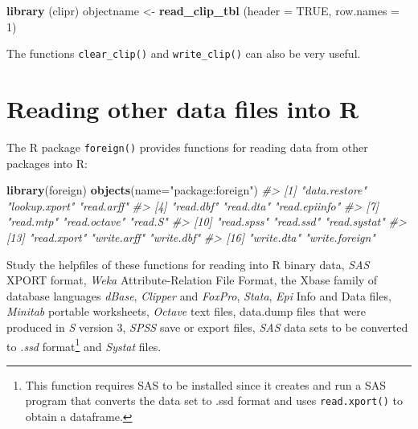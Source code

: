 \documentclass[
]{book}
\newenvironment{Shaded}{\begin{snugshade}}{\end{snugshade}}
\newcommand{\AttributeTok}[1]{\textcolor[rgb]{0.13,0.29,0.53}{#1}}
\newcommand{\CommentTok}[1]{\textcolor[rgb]{0.56,0.35,0.01}{\textit{#1}}}
\newcommand{\ConstantTok}[1]{\textcolor[rgb]{0.56,0.35,0.01}{#1}}
\newcommand{\DecValTok}[1]{\textcolor[rgb]{0.00,0.00,0.81}{#1}}
\newcommand{\FunctionTok}[1]{\textcolor[rgb]{0.13,0.29,0.53}{\textbf{#1}}}
\newcommand{\NormalTok}[1]{#1}
\newcommand{\OtherTok}[1]{\textcolor[rgb]{0.56,0.35,0.01}{#1}}
\newcommand{\StringTok}[1]{\textcolor[rgb]{0.31,0.60,0.02}{#1}}
\begin{document}
\begin{Shaded}
\begin{Highlighting}[]
\FunctionTok{library}\NormalTok{ (clipr)}
\NormalTok{objectname }\OtherTok{\textless{}{-}} \FunctionTok{read\_clip\_tbl}\NormalTok{ (}\AttributeTok{header =} \ConstantTok{TRUE}\NormalTok{, }\AttributeTok{row.names =} \DecValTok{1}\NormalTok{)}
\end{Highlighting}
\end{Shaded}

The functions \texttt{clear\_clip()} and \texttt{write\_clip()} can also be very useful.

\section{Reading other data files into R}\label{reading-other-data-files-into-r}

The R package \texttt{foreign()} provides functions for reading data from other packages into R:

\begin{Shaded}
\begin{Highlighting}[]
\FunctionTok{library}\NormalTok{(foreign)}
\FunctionTok{objects}\NormalTok{(}\AttributeTok{name=}\StringTok{"package:foreign"}\NormalTok{)}
\CommentTok{\#\textgreater{}  [1] "data.restore"  "lookup.xport"  "read.arff"    }
\CommentTok{\#\textgreater{}  [4] "read.dbf"      "read.dta"      "read.epiinfo" }
\CommentTok{\#\textgreater{}  [7] "read.mtp"      "read.octave"   "read.S"       }
\CommentTok{\#\textgreater{} [10] "read.spss"     "read.ssd"      "read.systat"  }
\CommentTok{\#\textgreater{} [13] "read.xport"    "write.arff"    "write.dbf"    }
\CommentTok{\#\textgreater{} [16] "write.dta"     "write.foreign"}
\end{Highlighting}
\end{Shaded}

Study the helpfiles of these functions for reading into R binary data, \emph{{SAS}} XPORT format, \emph{{Weka}} Attribute-Relation File Format, the Xbase family of database languages \emph{{dBase}}, \emph{{Clipper}} and \emph{{FoxPro}}, \emph{{Stata}}, \emph{{Epi}} Info and Data files, \emph{{Minitab}} portable worksheets, \emph{{Octave}} text files, data.dump files that were produced in \emph{{S}} version 3, \emph{{SPSS}} save or export files, \emph{{SAS}} data sets to be converted to \emph{{.ssd}} format\footnote{This function requires SAS to be installed since it creates and run a SAS program that converts the data set to .ssd format and uses \texttt{read.xport()} to obtain a dataframe.} and \emph{{Systat}} files.
\end{document}
